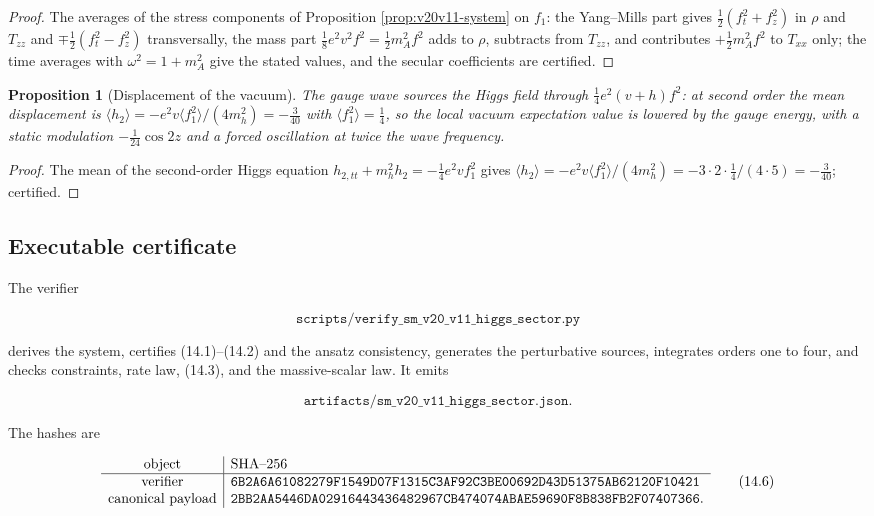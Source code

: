 \documentclass[11pt]{article}
\newtheorem{proposition}[theorem]{Proposition}
\theoremstyle{remark}
\begin{document}
\begin{proof}
The averages of the stress components of Proposition
\ref{prop:v20v11-system} on \(f_1\): the Yang--Mills part gives
\(\tfrac12(f_t^2+f_z^2)\) in \(\rho\) and \(T_{zz}\) and
\(\mp\tfrac12(f_t^2-f_z^2)\) transversally, the mass part
\(\tfrac18e^2v^2f^2=\tfrac12m_A^2f^2\) adds to \(\rho\), subtracts from
\(T_{zz}\), and contributes \(+\tfrac12m_A^2f^2\) to \(T_{xx}\) only;
the time averages with \(\omega^2=1+m_A^2\) give the stated values,
and the secular coefficients are certified.
\end{proof}

\begin{proposition}[Displacement of the vacuum]
\label{prop:v20v11-vev}
The gauge wave sources the Higgs field through
\(\tfrac14e^2(v+h)f^2\): at second order the mean displacement is
\(\langle h_2\rangle=-e^2v\langle f_1^2\rangle/(4m_h^2)=-\tfrac3{40}\)
with \(\langle f_1^2\rangle=\tfrac14\), so the local vacuum expectation
value is lowered by the gauge energy, with a static modulation
\(-\tfrac1{24}\cos2z\) and a forced oscillation at twice the wave
frequency.
\end{proposition}

\begin{proof}
The mean of the second-order Higgs equation
\(h_{2,tt}+m_h^2h_2=-\tfrac14e^2vf_1^2\) gives
\(\langle h_2\rangle=-e^2v\langle f_1^2\rangle/(4m_h^2)=-3\cdot2\cdot\tfrac14/(4\cdot5)=-\tfrac3{40}\);
certified.
\end{proof}

\subsection{Executable certificate}

The verifier

\[
 \texttt{scripts/verify\_sm\_v20\_v11\_higgs\_sector.py}              \tag{14.4}
\]

derives the system, certifies (14.1)--(14.2) and the ansatz
consistency, generates the perturbative sources, integrates orders one
to four, and checks constraints, rate law, (14.3), and the
massive-scalar law.  It emits

\[
 \texttt{artifacts/sm\_v20\_v11\_higgs\_sector.json}.                 \tag{14.5}
\]

The hashes are

\[
\begin{array}{c|l}
\hbox{object}&\hbox{SHA--256}\\ \hline
\hbox{verifier}&
\texttt{6B2A6A61082279F1549D07F1315C3AF92C3BE00692D43D51375AB62120F10421}\\
\hbox{canonical payload}&
\texttt{2BB2AA5446DA02916443436482967CB474074ABAE59690F8B838FB2F07407366}.
\end{array}                                                     \tag{14.6}
\]
\end{document}
